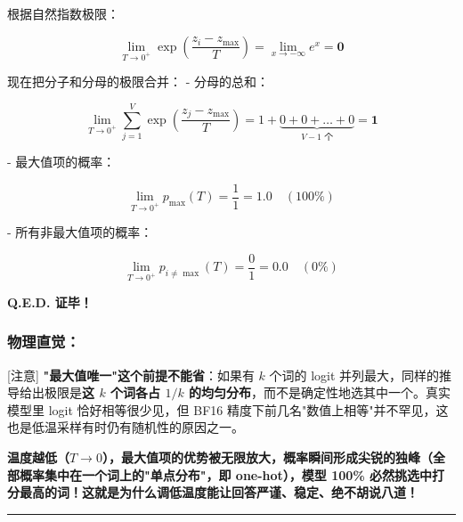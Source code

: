\begin{noteBox}[核心导读与背景]
根据自然指数极限：
\end{noteBox}

\[
\lim_{T \to 0^+} \exp\left(\frac{z_i - z_{\max}}{T}\right) = \lim_{x \to -\infty} e^x = \mathbf{0}
\]

\begin{noteBox}[核心导读与背景]
现在把分子和分母的极限合并：
- 分母的总和：
\end{noteBox}

\[
\lim_{T \to 0^+} \sum_{j=1}^V \exp\left(\frac{z_j - z_{\max}}{T}\right) = 1 + \underbrace{0 + 0 + \dots + 0}_{V-1 \text{ 个}} = \mathbf{1}
\]

\begin{noteBox}[核心导读与背景]
- 最大值项的概率：
\end{noteBox}

\[
\lim_{T \to 0^+} p_{\max}(T) = \frac{1}{1} = \mathbf{1.0} \quad (100\%)
\]

\begin{noteBox}[核心导读与背景]
- 所有非最大值项的概率：
\end{noteBox}

\[
\lim_{T \to 0^+} p_{i \neq \max}(T) = \frac{0}{1} = \mathbf{0.0} \quad (0\%)
\]

\begin{noteBox}[核心导读与背景]
\textbf{Q.E.D. 证毕！}
\end{noteBox}

\subsubsection{物理直觉：}

\begin{warningBox}[避坑指南与核心警示]
{}[注意] \textbf{"最大值唯一"这个前提不能省}：如果有 $k$ 个词的 logit 并列最大，同样的推导给出极限是\textbf{这 $k$ 个词各占 $1/k$ 的均匀分布}，而不是确定性地选其中一个。真实模型里 logit 恰好相等很少见，但 BF16 精度下前几名"数值上相等"并不罕见，这也是低温采样有时仍有随机性的原因之一。
\end{warningBox}

\textbf{温度越低（$T \to 0$），最大值项的优势被无限放大，概率瞬间形成尖锐的独峰（全部概率集中在一个词上的"单点分布"，即 one-hot），模型 100\% 必然挑选中打分最高的词！这就是为什么调低温度能让回答严谨、稳定、绝不胡说八道！}

\vspace{0.8em}\hrule\vspace{0.8em}

